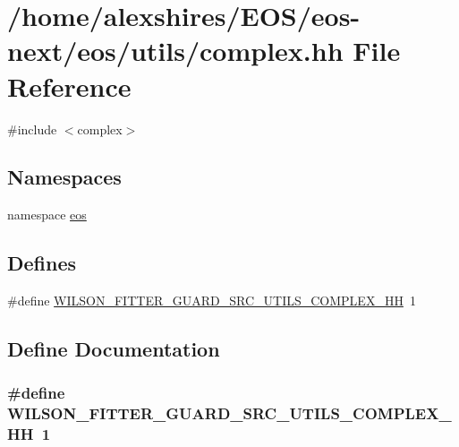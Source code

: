 \hypertarget{complex_8hh}{
\section{/home/alexshires/EOS/eos-\/next/eos/utils/complex.hh File Reference}
\label{complex_8hh}
}
{\ttfamily \#include $<$complex$>$}\par
\subsection*{Namespaces}
\begin{DoxyCompactItemize}
\item 
namespace \hyperlink{namespaceeos}{eos}
\end{DoxyCompactItemize}
\subsection*{Defines}
\begin{DoxyCompactItemize}
\item 
\#define \hyperlink{complex_8hh_a2fe09ac643d095558e312629b20b0830}{WILSON\_\-FITTER\_\-GUARD\_\-SRC\_\-UTILS\_\-COMPLEX\_\-HH}~1
\end{DoxyCompactItemize}


\subsection{Define Documentation}
\hypertarget{complex_8hh_a2fe09ac643d095558e312629b20b0830}{
\subsubsection[{WILSON\_\-FITTER\_\-GUARD\_\-SRC\_\-UTILS\_\-COMPLEX\_\-HH}]{\setlength{\rightskip}{0pt plus 5cm}\#define WILSON\_\-FITTER\_\-GUARD\_\-SRC\_\-UTILS\_\-COMPLEX\_\-HH~1}}
\label{complex_8hh_a2fe09ac643d095558e312629b20b0830}

